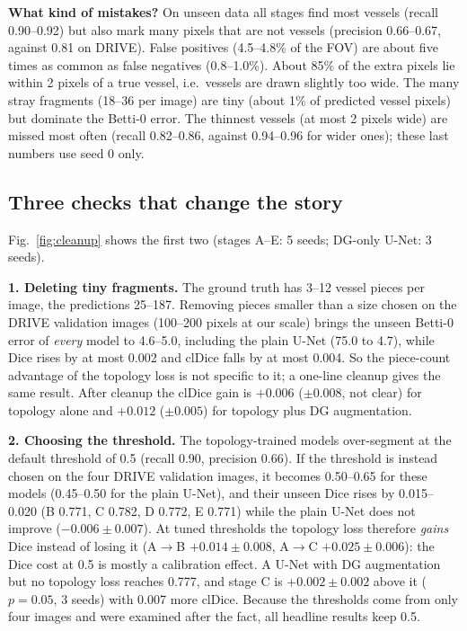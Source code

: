 \documentclass[conference]{IEEEtran}
\begin{document}
\textbf{What kind of mistakes?} On unseen data all stages find most vessels (recall 0.90--0.92) but also mark many pixels that are not vessels (precision 0.66--0.67, against 0.81 on DRIVE). False positives (4.5--4.8\% of the FOV) are about five times as common as false negatives (0.8--1.0\%). About 85\% of the extra pixels lie within 2 pixels of a true vessel, i.e.\ vessels are drawn slightly too wide. The many stray fragments (18--36 per image) are tiny (about 1\% of predicted vessel pixels) but dominate the Betti-0 error. The thinnest vessels (at most 2 pixels wide) are missed most often (recall 0.82--0.86, against 0.94--0.96 for wider ones); these last numbers use seed 0 only.

\subsection{Three checks that change the story}
Fig.~\ref{fig:cleanup} shows the first two (stages A--E: 5 seeds; DG-only U-Net: 3 seeds).

\textbf{1. Deleting tiny fragments.} The ground truth has 3--12 vessel pieces per image, the predictions 25--187. Removing pieces smaller than a size chosen on the DRIVE validation images (100--200 pixels at our scale) brings the unseen Betti-0 error of \emph{every} model to 4.6--5.0, including the plain U-Net (75.0 to 4.7), while Dice rises by at most 0.002 and clDice falls by at most 0.004. So the piece-count advantage of the topology loss is not specific to it; a one-line cleanup gives the same result. After cleanup the clDice gain is $+0.006$ ($\pm0.008$, not clear) for topology alone and $+0.012$ ($\pm0.005$) for topology plus DG augmentation.

\textbf{2. Choosing the threshold.} The topology-trained models over-segment at the default threshold of 0.5 (recall 0.90, precision 0.66). If the threshold is instead chosen on the four DRIVE validation images, it becomes 0.50--0.65 for these models (0.45--0.50 for the plain U-Net), and their unseen Dice rises by 0.015--0.020 (B 0.771, C 0.782, D 0.772, E 0.771) while the plain U-Net does not improve ($-0.006\pm0.007$). At tuned thresholds the topology loss therefore \emph{gains} Dice instead of losing it (A$\rightarrow$B $+0.014\pm0.008$, A$\rightarrow$C $+0.025\pm0.006$): the Dice cost at 0.5 is mostly a calibration effect. A U-Net with DG augmentation but no topology loss reaches 0.777, and stage C is $+0.002\pm0.002$ above it ($p{=}0.05$, 3 seeds) with 0.007 more clDice. Because the thresholds come from only four images and were examined after the fact, all headline results keep 0.5.
\end{document}
